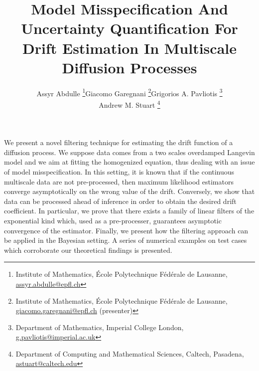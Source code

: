 \documentclass{article}
\title{Model Misspecification And Uncertainty Quantification For Drift Estimation In Multiscale Diffusion Processes}
\author{\begin{tabular}{ccc}
		Assyr Abdulle \thanks{Institute of Mathematics, École Polytechnique Fédérale de
		Lausanne, \href{mailto:assyr.abdulle@epfl.ch}{assyr.abdulle@epfl.ch}}
		& Giacomo Garegnani \thanks{Institute of Mathematics, École Polytechnique Fédérale de Lausanne, \href{mailto:giacomo.garegnani@epfl.ch}{giacomo.garegnani@epfl.ch} (presenter)}
		& Grigorios A. Pavliotis \thanks{Department of Mathematics, Imperial College London, \href{mailto:g.pavliotis@imperial.ac.uk}{g.pavliotis@imperial.ac.uk}}
		\\ & Andrew M. Stuart \thanks{Department of Computing and Mathematical Sciences, Caltech, Pasadena, \href{mailto:astuart@caltech.edu}{astuart@caltech.edu}} &
		\end{tabular}}
\date{}
\begin{document}
\maketitle

\noindent We present a novel filtering technique for estimating the drift function of a diffusion process. We suppose data comes from a two scales overdamped Langevin model and we aim at fitting the homogenized equation, thus dealing with an issue of model misspecification. In this setting, it is known that if the continuous multiscale data are not pre-processed, then maximum likelihood estimators converge asymptotically on the wrong value of the drift. Conversely, we show that data can be processed ahead of inference in order to obtain the desired drift coefficient. In particular, we prove that there exists a family of linear filters of the exponential kind which, used as a pre-processer, guarantees asymptotic convergence of the estimator. Finally, we present how the filtering approach can be applied in the Bayesian setting. A series of numerical examples on test cases which corroborate our theoretical findings is presented.
\end{document}
